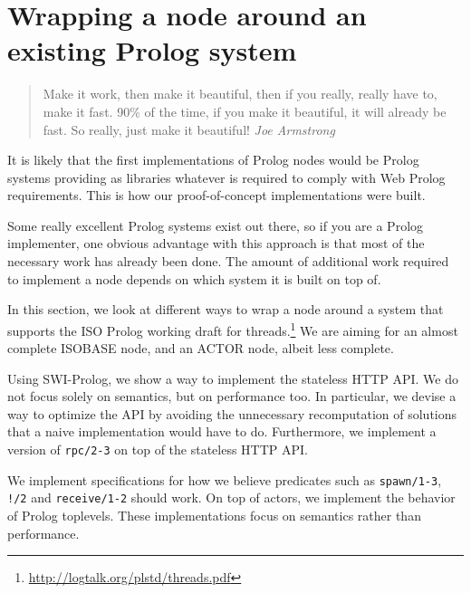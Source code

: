 \section{Wrapping a node around an existing Prolog system}\label{sec:node-implementation-on-top-of-current}

\begin{quotation}
\noindent Make it work, then make it beautiful, then if you really, really have to, make it fast. 90\% of the time, if you make it beautiful, it will already be fast. So really, just make it beautiful!
\flushright\textit{Joe Armstrong}
\vspace{0.3cm}
\end{quotation}

\noindent %
It is likely that the first implementations of Prolog nodes would be Prolog systems providing as libraries whatever is required to comply with Web Prolog requirements. This is how our proof-of-concept implementations were built.

Some really excellent Prolog systems exist out there, so if you are a Prolog implementer, one obvious advantage with this approach is that most of the necessary work has already been done. %
The amount of additional work required to implement a node depends on which system it is built on top of. %

In this section, we look at different ways to wrap a node around a system that supports the ISO Prolog working draft for threads.\footnote{\url{http://logtalk.org/plstd/threads.pdf}} We are aiming for an almost complete ISOBASE node, and an ACTOR node, albeit less complete.

Using SWI-Prolog, we show a way to implement the stateless HTTP API. We do not focus solely on semantics, but on performance too. In particular, we devise a way to optimize the API by avoiding the unnecessary recomputation of solutions that a naive implementation would have to do.  Furthermore, we implement a version of \texttt{rpc/2-3} on top of the stateless HTTP API. 

We implement specifications for how we believe predicates such as \texttt{spawn/1-3}, \texttt{!/2} and \texttt{receive/1-2} should work. On top of actors, we implement the behavior of Prolog toplevels. These implementations focus on semantics rather than performance. 

